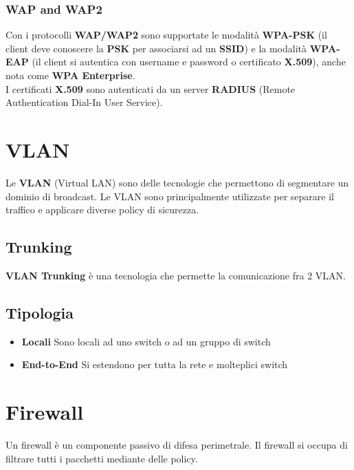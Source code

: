 \documentclass{article}
\begin{document}
\subsubsection{WAP and WAP2}

Con i protocolli \textbf{WAP/WAP2} sono supportate le modalità \textbf{WPA-PSK}
(il client deve conoscere la \textbf{PSK} per associarsi ad un \textbf{SSID}) e la modalità
\textbf{WPA-EAP} (il client si autentica con username e password o certificato \textbf{X.509}),
anche nota come \textbf{WPA Enterprise}.
\\
I certificati \textbf{X.509} sono autenticati da un server \textbf{RADIUS}
(Remote Authentication Dial-In User Service).

\pagebreak

\section{VLAN}

Le \textbf{VLAN} (Virtual LAN) sono delle tecnologie che permettono di segmentare
un dominio di broadcast. Le VLAN sono principalmente utilizzate per separare
il traffico e applicare diverse policy di sicurezza.

\subsection{Trunking}

\textbf{VLAN Trunking} è una tecnologia che permette la comunicazione fra 2 VLAN.

\subsection{Tipologia}

\begin{itemize}
    \item \textbf{Locali} Sono locali ad uno switch o ad un gruppo di switch 
    \item \textbf{End-to-End} Si estendono per tutta la rete e molteplici switch
\end{itemize}

\section{Firewall}

Un firewall è un componente passivo di difesa perimetrale.
Il firewall si occupa di filtrare tutti i pacchetti mediante delle policy.
\end{document}
